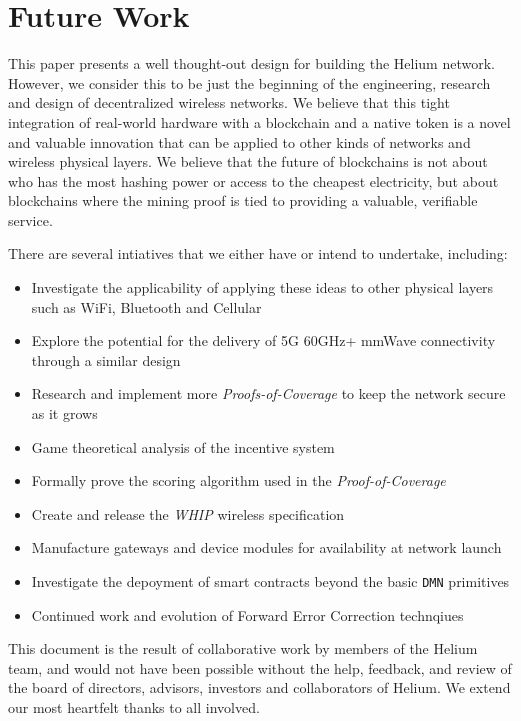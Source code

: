 \documentclass[10pt, nonatbib, nocopyrightspace, reprint]{sigplanconf}
\begin{document}
\begin{description}
\end{description}

\section{Future Work}

This paper presents a well thought-out design for building the Helium network. However, we consider this to be just the beginning of the engineering, research and design of decentralized wireless networks. We believe that this tight integration of real-world hardware with a blockchain and a native token is a novel and valuable innovation that can be applied to other kinds of networks and wireless physical layers. We believe that the future of blockchains is not about who has the most hashing power or access to the cheapest electricity, but about blockchains where the mining proof is tied to providing a valuable, verifiable service. 

There are several intiatives that we either have or intend to undertake, including:

\begin{itemize}
    \item Investigate the applicability of applying these ideas to other physical layers such as WiFi, Bluetooth and Cellular
    \item Explore the potential for the delivery of 5G 60GHz+ mmWave connectivity through a similar design
    \item Research and implement more \emph{Proofs-of-Coverage} to keep the network secure as it grows
    \item Game theoretical analysis of the incentive system
    \item Formally prove the scoring algorithm used in the \emph{Proof-of-Coverage}
    \item Create and release the \emph{WHIP} wireless specification
    \item Manufacture gateways and device modules for availability at network launch
    \item Investigate the depoyment of smart contracts beyond the basic \verb|DMN| primitives
    \item Continued work and evolution of Forward Error Correction technqiues
\end{itemize}

\acks

This document is the result of collaborative work by members of the Helium team, and would not have been possible without the help, feedback, and review of the board of directors, advisors, investors and collaborators of Helium. We extend our most heartfelt thanks to all involved.
\end{document}
